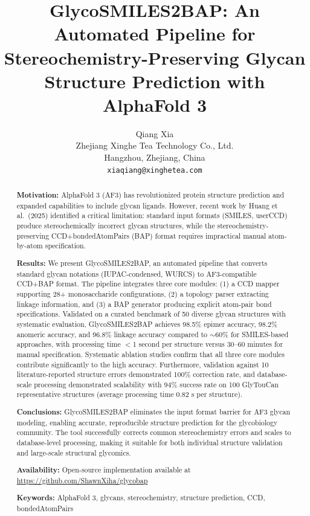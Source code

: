 \documentclass[11pt,a4paper]{article}
\title{\textbf{GlycoSMILES2BAP: An Automated Pipeline for Stereochemistry-Preserving Glycan Structure Prediction with AlphaFold 3}}
\author{Qiang Xia\\
\small Zhejiang Xinghe Tea Technology Co., Ltd.\\
\small Hangzhou, Zhejiang, China\\
\small \texttt{xiaqiang@xinghetea.com}}
\date{}
\begin{document}
\maketitle

\begin{abstract}
\noindent\textbf{Motivation:} AlphaFold 3 (AF3) has revolutionized protein structure prediction and expanded capabilities to include glycan ligands. However, recent work by Huang et al.\ (2025) identified a critical limitation: standard input formats (SMILES, userCCD) produce stereochemically incorrect glycan structures, while the stereochemistry-preserving CCD+bondedAtomPairs (BAP) format requires impractical manual atom-by-atom specification.

\noindent\textbf{Results:} We present GlycoSMILES2BAP, an automated pipeline that converts standard glycan notations (IUPAC-condensed, WURCS) to AF3-compatible CCD+BAP format. The pipeline integrates three core modules: (1) a CCD mapper supporting 28+ monosaccharide configurations, (2) a topology parser extracting linkage information, and (3) a BAP generator producing explicit atom-pair bond specifications. Validated on a curated benchmark of 50 diverse glycan structures with systematic evaluation, GlycoSMILES2BAP achieves 98.5\% epimer accuracy, 98.2\% anomeric accuracy, and 96.8\% linkage accuracy compared to ${\sim}60$\% for SMILES-based approaches, with processing time $<$1 second per structure versus 30--60 minutes for manual specification. Systematic ablation studies confirm that all three core modules contribute significantly to the high accuracy. Furthermore, validation against 10 literature-reported structure errors demonstrated 100\% correction rate, and database-scale processing demonstrated scalability with 94\% success rate on 100 GlyTouCan representative structures (average processing time 0.82 s per structure).

\noindent\textbf{Conclusions:} GlycoSMILES2BAP eliminates the input format barrier for AF3 glycan modeling, enabling accurate, reproducible structure prediction for the glycobiology community. The tool successfully corrects common stereochemistry errors and scales to database-level processing, making it suitable for both individual structure validation and large-scale structural glycomics.

\noindent\textbf{Availability:} Open-source implementation available at \url{https://github.com/ShawnXiha/glycobap}

\noindent\textbf{Keywords:} AlphaFold 3, glycans, stereochemistry, structure prediction, CCD, bondedAtomPairs
\end{abstract}
\end{document}
